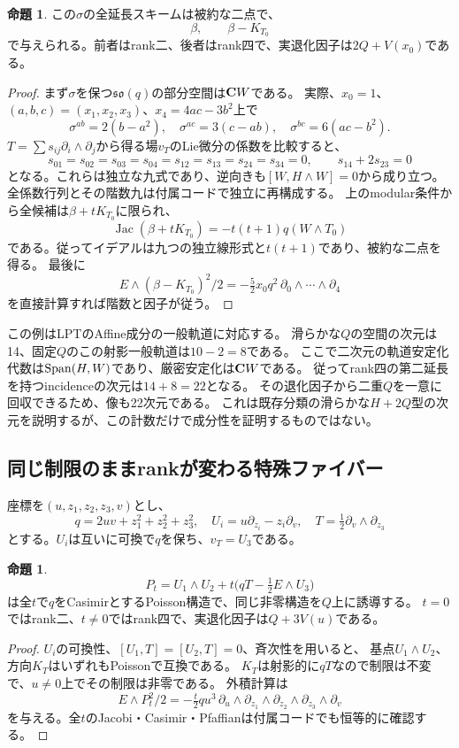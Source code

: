 \documentclass[a4paper,11pt]{ltjsarticle}
\theoremstyle{definition}
\newtheorem{proposition}[theorem]{命題}
\theoremstyle{definition}\newtheorem{definition}[theorem]{定義}
\theoremstyle{remark}\newtheorem{remark}[theorem]{注意}
\newcommand{\Jac}{\operatorname{Jac}}
\begin{document}
\begin{proposition}\label{prop:affine-two}
この$\sigma$の全延長スキームは被約な二点で、
\[
 \beta,\qquad \beta-K_{T_0}
\]
で与えられる。前者はrank二、後者はrank四で、実退化因子は$2Q+V(x_0)$である。
\end{proposition}
\begin{proof}
まず$\sigma$を保つ$\mathfrak{so}(q)$の部分空間は$\mathbf C W$である。
実際、$x_0=1$、$(a,b,c)=(x_1,x_2,x_3)$、$x_4=4ac-3b^2$上で
\[
\sigma^{ab}=2(b-a^2),\quad \sigma^{ac}=3(c-ab),\quad \sigma^{bc}=6(ac-b^2).
\]
$T=\sum s_{ij}\partial_i\wedge\partial_j$から得る場$v_T$のLie微分の係数を比較すると、
\[
 s_{01}=s_{02}=s_{03}=s_{04}=s_{12}=s_{13}=s_{24}=s_{34}=0,
 \qquad s_{14}+2s_{23}=0
\]
となる。これらは独立な九式であり、逆向きも$[W,H\wedge W]=0$から成り立つ。
全係数行列とその階数九は付属コードで独立に再構成する。
上のmodular条件から全候補は$\beta+tK_{T_0}$に限られ、
\[
 \Jac(\beta+tK_{T_0})=-t(t+1)q(W\wedge T_0)
\]
である。従ってイデアルは九つの独立線形式と$t(t+1)$であり、被約な二点を得る。
最後に
\[
 E\wedge(\beta-K_{T_0})^2/2=-\tfrac52x_0q^2\,\partial_0\wedge\cdots\wedge\partial_4
\]
を直接計算すれば階数と因子が従う。
\end{proof}

この例はLPTのAffine成分の一般軌道に対応する\cite[Example 5.1, Theorems 5.2, 9.1]{LPT}。
滑らかな$Q$の空間の次元は14、固定$Q$のこの射影一般軌道は$10-2=8$である。
ここで二次元の軌道安定化代数は$\operatorname{Span}(H,W)$であり、厳密安定化は$\mathbf C W$である。
従ってrank四の第二延長を持つincidenceの次元は$14+8=22$となる。
その退化因子から二重$Q$を一意に回収できるため、像も22次元である。
これは既存分類の滑らかな$H+2Q$型の次元を説明するが、この計数だけで成分性を証明するものではない。




\subsection{同じ制限のままrankが変わる特殊ファイバー}
座標を$(u,z_1,z_2,z_3,v)$とし、
\[
 q=2uv+z_1^2+z_2^2+z_3^2,\quad U_i=u\partial_{z_i}-z_i\partial_v,
 \quad T=\tfrac12\partial_v\wedge\partial_{z_3}
\]
とする。$U_i$は互いに可換で$q$を保ち、$v_T=U_3$である。
\begin{proposition}\label{prop:rankjump}
\[
 P_t=U_1\wedge U_2+t\bigl(qT-\tfrac12E\wedge U_3\bigr)
\]
は全$t$で$q$をCasimirとするPoisson構造で、同じ非零構造を$Q$上に誘導する。
$t=0$ではrank二、$t\ne0$ではrank四で、実退化因子は$Q+3V(u)$である。
\end{proposition}
\begin{proof}
$U_i$の可換性、$[U_1,T]=[U_2,T]=0$、斉次性を用いると、
基点$U_1\wedge U_2$、方向$K_T$はいずれもPoissonで互換である。
$K_T$は射影的に$qT$なので制限は不変で、$u\ne0$上でその制限は非零である。
外積計算は
\[
 E\wedge P_t^2/2=-\tfrac t2 q u^3\,\partial_u\wedge\partial_{z_1}\wedge
 \partial_{z_2}\wedge\partial_{z_3}\wedge\partial_v
\]
を与える。全$t$のJacobi・Casimir・Pfaffianは付属コードでも恒等的に確認する。
\end{proof}
\end{document}
